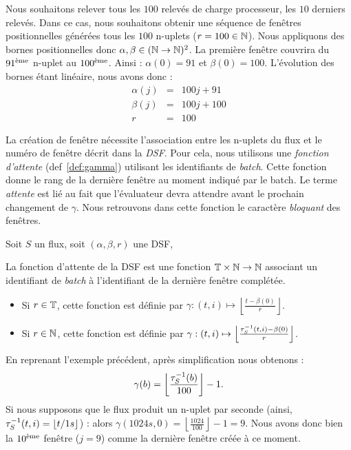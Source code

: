 \begin{example}
    Nous souhaitons relever tous les $100$ relevés de charge processeur, les $10$ derniers relevés. Dans ce cas, nous souhaitons obtenir une séquence de fenêtres positionnelles générées tous les $100$ n-uplets ($r=100\in \mathbb{N}$). Nous appliquons des bornes positionnelles donc $\alpha,\beta \in (\mathbb{N}\to\mathbb{N})^2$. La première fenêtre couvrira du $91^{\textrm{\`{e}me}}$ n-uplet au $100^{\textrm{\`{e}me}}$. Ainsi : $\alpha(0) = 91$ et $\beta(0) = 100$. L'évolution des bornes étant linéaire, nous avons donc :
\begin{eqnarray*}
 \alpha(j) &=& 100j+91\\
 \beta(j) &=& 100j + 100\\
 r & = & 100
\end{eqnarray*}
\end{example}

La création de fenêtre nécessite l'association entre les n-uplets du flux et le numéro de fenêtre décrit dans la \textit{DSF}. Pour cela, nous utilisons une \textit{fonction d'attente} (def~\ref{def:gamma}) utilisant les identifiants de \textit{batch}. Cette fonction donne le rang de la dernière fenêtre au moment indiqué par le batch. Le terme \textit{attente} est lié au fait que l'évaluateur devra attendre avant le prochain changement de $\gamma$.
Nous retrouvons dans cette fonction le caractère \textit{bloquant} des fenêtres.
\begin{defi}\label{def:gamma}
    Soit $S$ un flux, soit $(\alpha,\beta,r)$ une DSF,

    La fonction d'attente de la DSF est une fonction $\mathbb{T}\times\mathbb{N} \to \mathbb{N}$ associant un identifiant de \textit{batch} à l'identifiant de la dernière fenêtre complétée.
\begin{itemize}
 \item  Si $r\in\mathbb{T}$, cette fonction est définie par $\gamma : (t,i) \mapsto \left\lfloor \frac{t-\beta(0)}{r} \right\rfloor$.
 \item  Si $r\in\mathbb{N}$, cette fonction est définie par $\gamma : (t,i) \mapsto \left\lfloor \frac{\tau^{-1}_S(t,i)-\beta(0)}{r} \right\rfloor$.
\end{itemize}
\end{defi}
\begin{example}
    En reprenant l'exemple précédent, après simplification nous obtenons : $$\gamma(b) = \left\lfloor \frac{\tau^{-1}_S(b)}{100}\right\rfloor-1.$$
    Si nous supposons que le flux produit un n-uplet par seconde (ainsi, $\tau^{-1}_S(t,i) = \lfloor t/1s \rfloor$) : alors $\gamma(1024s,0) = \left\lfloor \frac{1024}{100}\right\rfloor-1 = 9$. Nous avons donc bien la $10^{\textrm{\`{e}me}}$ fenêtre ($j=9$) comme la dernière fenêtre créée à ce moment.
\end{example}

